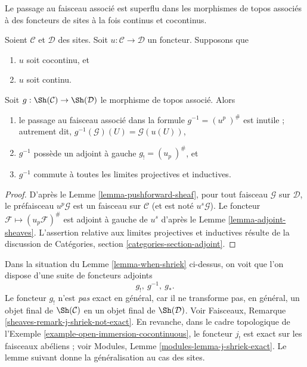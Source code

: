 \begin{lemma}
\label{lemma-when-shriek}
\begin{slogan}
Le passage au faisceau associé est superflu dans les morphismes de topos
associés à des foncteurs de sites à la fois continus et cocontinus.
\end{slogan}
Soient $\mathcal{C}$ et $\mathcal{D}$ des sites.
Soit $u : \mathcal{C} \to \mathcal{D}$ un foncteur.
Supposons que
\begin{enumerate}
\item[(a)] $u$ soit cocontinu, et
\item[(b)] $u$ soit continu.
\end{enumerate}
Soit $g : \Sh(\mathcal{C}) \to \Sh(\mathcal{D})$
le morphisme de topos associé. Alors
\begin{enumerate}
\item le passage au faisceau associé dans la formule
$g^{-1} = (u^p\ )^\#$ est inutile ; autrement dit,
$g^{-1}(\mathcal{G})(U) = \mathcal{G}(u(U))$,
\item $g^{-1}$ possède un adjoint à gauche $g_{!} = (u_p\ )^\#$, et
\item $g^{-1}$ commute à toutes les limites projectives et inductives.
\end{enumerate}
\end{lemma}

\begin{proof}
D’après le Lemme \ref{lemma-pushforward-sheaf}, pour tout faisceau
$\mathcal{G}$ sur $\mathcal{D}$, le préfaisceau $u^p\mathcal{G}$ est un
faisceau sur $\mathcal{C}$ (et est noté $u^s\mathcal{G}$). Le foncteur
$\mathcal{F} \mapsto (u_p\mathcal{F})^\#$ est adjoint à gauche de $u^s$
d’après le Lemme \ref{lemma-adjoint-sheaves}. L’assertion relative aux limites
projectives et inductives résulte de la discussion de Catégories,
section \ref{categories-section-adjoint}.
\end{proof}

\noindent
Dans la situation du Lemme \ref{lemma-when-shriek} ci-dessus, on voit que
l’on dispose d’une suite de foncteurs adjoints
$$
g_{!}, \ g^{-1}, \ g_*.
$$
Le foncteur $g_!$ n’est {\it pas} exact en général, car il ne transforme pas,
en général, un objet final de $\Sh(\mathcal{C})$ en un objet final de
$\Sh(\mathcal{D})$.
Voir Faisceaux, Remarque \ref{sheaves-remark-j-shriek-not-exact}.
En revanche, dans le cadre topologique de
l’Exemple \ref{example-open-immersion-cocontinuous}, le foncteur $j_!$ est
exact sur les faisceaux abéliens ; voir Modules,
Lemme \ref{modules-lemma-j-shriek-exact}. Le lemme suivant donne la
généralisation au cas des sites.

